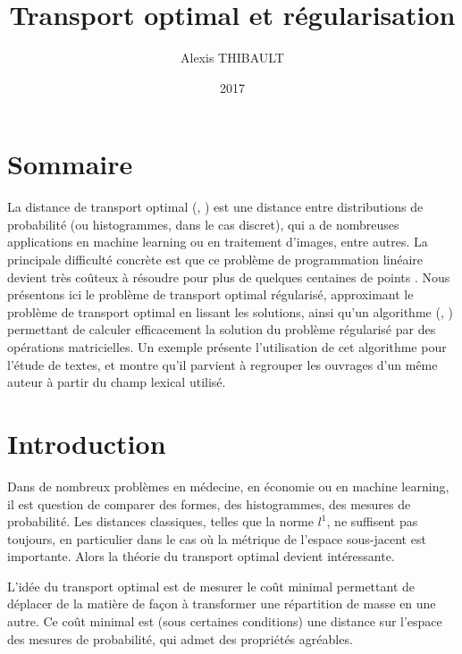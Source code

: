 
\usepackage{subcaption}

\DeclareMathOperator{\diag}{diag}
\DeclareMathOperator{\Ccal}{\mathcal{C}}
\renewcommand{\epsilon}{\varepsilon}
\newcommand{\tab}{\ \ \ \ }

\title{Transport optimal et régularisation}
\author{Alexis THIBAULT}
\date{2017}



\maketitle

\section*{Sommaire}
La distance de transport optimal (\cite{villani08}, \cite{santambrogio15}) est une distance entre distributions de probabilité (ou histogrammes, dans le cas discret), qui a de nombreuses applications en machine learning ou en traitement d'images, entre autres. La principale difficulté concrète est que ce problème de programmation linéaire devient très coûteux à résoudre pour plus de quelques centaines de points \cite{pele09}. Nous présentons ici le problème de transport optimal régularisé, approximant le problème de transport optimal en lissant les solutions, ainsi qu'un algorithme (\cite{cuturi13}, \cite{benamou15}) permettant de calculer efficacement la solution du problème régularisé par des opérations matricielles. Un exemple présente l'utilisation de cet algorithme pour l'étude de textes, et montre qu'il parvient à regrouper les ouvrages d'un même auteur à partir du champ lexical utilisé.



\section{Introduction}
Dans de nombreux problèmes en médecine, en économie ou en machine learning, il est question de comparer des formes, des histogrammes, des mesures de probabilité.
Les distances classiques, telles que la norme $l^1$, ne suffisent pas toujours, en particulier dans le cas où la métrique de l'espace sous-jacent est importante. Alors la théorie du transport  optimal \cite{villani08} devient intéressante.

L'idée du transport optimal est de mesurer le coût minimal permettant de déplacer de la matière de façon à transformer une répartition de masse en une autre. Ce coût minimal est (sous certaines conditions) une distance sur l'espace des mesures de probabilité\cite{villani08}, qui admet des propriétés agréables.

